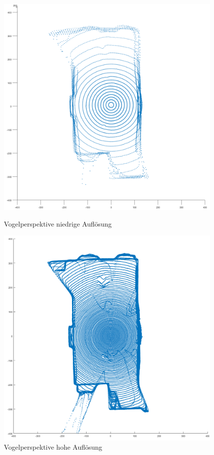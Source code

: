 \begin{figure}[htb]
	\centering
	\begin{minipage}[t]{0.45\linewidth}
		\centering
		\includegraphics[width=1.2\linewidth]{images/Validierung/Aufloesungen/niedrig_vogel.png}
		\caption{Vogelperspektive niedrige Auflösung}
		\label{vogel niedrigeAuflösung}
	\end{minipage}
	\hfill
	\begin{minipage}[t]{0.45\linewidth}
		\centering
		\includegraphics[width=1.2\linewidth]{images/Validierung/Aufloesungen/hoch_vogel.png}
		\caption{Vogelperspektive hohe Auflösung}
		\label{vogel hoheAuflösung}
	\end{minipage}
\end{figure}


